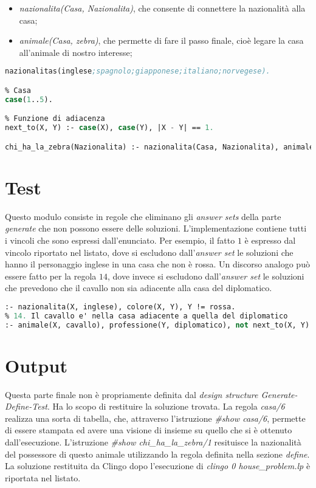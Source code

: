 \documentclass[12pt]{report}
\begin{document}
\begin{itemize}
\item \emph{nazionalita(Casa, Nazionalita)}, che consente di connettere la nazionalità alla casa;
\item \emph{animale(Casa, zebra)}, che permette di fare il passo finale, cioè legare la casa all'animale di nostro interesse;
\end{itemize}

\begin{lstlisting}[language=lisp]
% Nazionalita'
nazionalitas(inglese;spagnolo;giapponese;italiano;norvegese).

% Casa
case(1..5).

% Funzione di adiacenza
next_to(X, Y) :- case(X), case(Y), |X - Y| == 1.

chi_ha_la_zebra(Nazionalita) :- nazionalita(Casa, Nazionalita), animale(Casa, zebra).
\end{lstlisting}

\section{Test}
Questo modulo consiste in regole che eliminano gli \emph{answer sets} della parte \emph{generate} che non possono essere delle soluzioni.
L'implementazione contiene tutti i vincoli che sono espressi dall'enunciato.
Per esempio, il fatto $1$ è espresso dal vincolo riportato nel listato, dove si escludono dall'\emph{answer set} le soluzioni che hanno il personaggio inglese in una casa che non è rossa.
Un discorso analogo può essere fatto per la regola $14$, dove invece si escludono dall'\emph{answer set} le soluzioni che prevedono che il cavallo non sia adiacente alla casa del diplomatico.

\begin{lstlisting}[language=lisp]
% 1. L'inglese vive nella casa rossa.
:- nazionalita(X, inglese), colore(X, Y), Y != rossa.
% 14. Il cavallo e' nella casa adiacente a quella del diplomatico
:- animale(X, cavallo), professione(Y, diplomatico), not next_to(X, Y).
\end{lstlisting}

\section{Output}
Questa parte finale non è propriamente definita dal \emph{design structure Generate-Define-Test}. 
Ha lo scopo di restituire la soluzione trovata.
La regola \emph{casa/6} realizza una sorta di tabella, che, attraverso l'istruzione \emph{\#show casa/6}, permette di essere stampata ed avere una visione di insieme su quello che si è ottenuto dall'esecuzione.
L'istruzione \emph{\#show chi\_ha\_la\_zebra/1} resituisce la nazionalità del possessore di questo animale utilizzando la regola definita nella sezione \emph{define}.
La soluzione restituita da Clingo dopo l'esecuzione di \emph{clingo 0 house\_problem.lp} è riportata nel listato.
\end{document}
